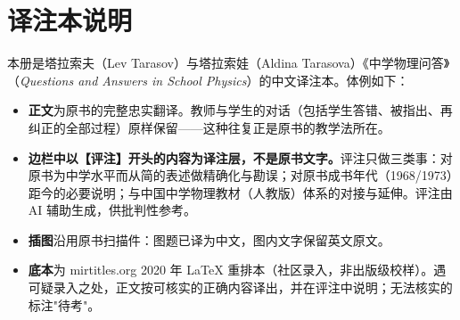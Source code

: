 
\vspace*{1cm}

\chapter[译注本说明]{译注本说明}
\label{zh-note}

本册是塔拉索夫（Lev Tarasov）与塔拉索娃（Aldina Tarasova）《中学物理问答》（\emph{Questions and Answers in School Physics}）的中文译注本。体例如下：

\begin{itemize}
\item \textbf{正文}为原书的完整忠实翻译。教师与学生的对话（包括学生答错、被指出、再纠正的全部过程）原样保留——这种往复正是原书的教学法所在。
\item \textbf{边栏中以【评注】开头的内容为译注层，不是原书文字。}评注只做三类事：对原书为中学水平而从简的表述做精确化与勘误；对原书成书年代（1968/1973）距今的必要说明；与中国中学物理教材（人教版）体系的对接与延伸。评注由 AI 辅助生成，供批判性参考。
\item \textbf{插图}沿用原书扫描件：图题已译为中文，图内文字保留英文原文。
\item \textbf{底本}为 mirtitles.org 2020 年 \LaTeX{} 重排本（社区录入，非出版级校样）。遇可疑录入之处，正文按可核实的正确内容译出，并在评注中说明；无法核实的标注"待考"。
\end{itemize}

\cleardoublepage
